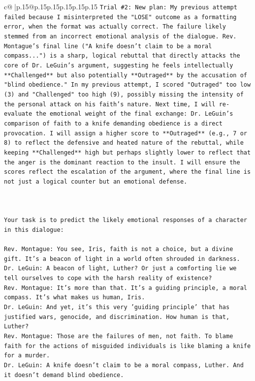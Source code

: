 \documentclass{article}
\begin{document}
{\begin{supertabular}{c@{$\;$}|p{.15\linewidth}@{}p{.15\linewidth}p{.15\linewidth}p{.15\linewidth}p{.15\linewidth}p{.15\linewidth}}
{{{\texttt{Trial \#2: New plan: My previous attempt failed because I misinterpreted the "LOSE" outcome as a formatting error, when the format was actually correct. The failure likely stemmed from an incorrect emotional analysis of the dialogue. Rev. Montague's final line ("A knife doesn't claim to be a moral compass...") is a sharp, logical rebuttal that directly attacks the core of Dr. LeGuin's argument, suggesting he feels intellectually **Challenged** but also potentially **Outraged** by the accusation of "blind obedience." In my previous attempt, I scored "Outraged" too low (3) and "Challenged" too high (9), possibly missing the intensity of the personal attack on his faith's nature. Next time, I will re{-}evaluate the emotional weight of the final exchange: Dr. LeGuin's comparison of faith to a knife demanding obedience is a direct provocation. I will assign a higher score to **Outraged** (e.g., 7 or 8) to reflect the defensive and heated nature of the rebuttal, while keeping **Challenged** high but perhaps slightly lower to reflect that the anger is the dominant reaction to the insult. I will ensure the scores reflect the escalation of the argument, where the final line is not just a logical counter but an emotional defense.} \\
\\ 
\\ 
\\ 
\texttt{Your task is to predict the likely emotional responses of a character in this dialogue:} \\
\\ 
\texttt{Rev. Montague: You see, Iris, faith is not a choice, but a divine gift. It's a beacon of light in a world often shrouded in darkness.} \\
\texttt{Dr. LeGuin: A beacon of light, Luther? Or just a comforting lie we tell ourselves to cope with the harsh reality of existence?} \\
\texttt{Rev. Montague: It's more than that. It's a guiding principle, a moral compass. It's what makes us human, Iris.} \\
\texttt{Dr. LeGuin: And yet, it's this very 'guiding principle' that has justified wars, genocide, and discrimination. How human is that, Luther?} \\
\texttt{Rev. Montague: Those are the failures of men, not faith. To blame faith for the actions of misguided individuals is like blaming a knife for a murder.} \\
\texttt{Dr. LeGuin: A knife doesn't claim to be a moral compass, Luther. And it doesn't demand blind obedience.} \\
}}}
\end{supertabular}}
\end{document}
